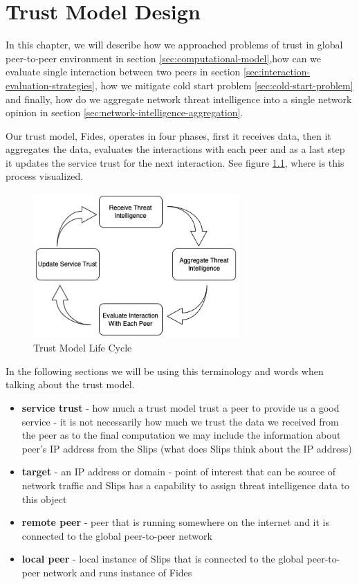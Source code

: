 \chapter{Trust Model Design}
\label{ch:trust-model-design}
In this chapter, we will describe how we approached problems of trust in global peer-to-peer environment in section \ref{sec:computational-model},how can we evaluate single interaction between two peers in section \ref{sec:interaction-evaluation-strategies}, how we mitigate cold start problem \ref{sec:cold-start-problem} and finally, how do we aggregate network threat intelligence into a single network opinion in section \ref{sec:network-intelligence-aggregation}.

Our trust model, Fides, operates in four phases, first it receives data, then it aggregates the data, evaluates the interactions with each peer and as a last step it updates the service trust for the next interaction.
See figure \ref{fig:trust-model-life-cycle}, where is this process visualized.

\begin{figure}[ht!]
    \centering
    \includegraphics[width=0.7\textwidth]{assets/service_trust_diagram.png}
    \caption{Trust Model Life Cycle}
    \label{fig:trust-model-life-cycle}
\end{figure}

In the following sections we will be using this terminology and words when talking about the trust model.

\begin{itemize}
\item \textbf{service trust} - how much a trust model trust a peer to provide us a good service - it is not necessarily how much we trust the data we received from the peer as to the final computation we may include the information about peer's IP address from the Slips (what does Slips think about the IP address)
\item \textbf{target} - an IP address or domain - point of interest that can be source of network traffic and Slips has a capability to assign threat intelligence data to this object
\item \textbf{remote peer} - peer that is running somewhere on the internet and it is connected to the global peer-to-peer network
\item \textbf{local peer} - local instance of Slips that is connected to the global peer-to-peer network and runs instance of Fides
\end{itemize}


